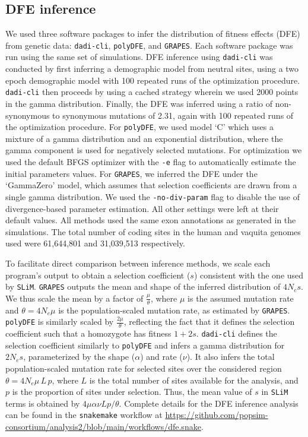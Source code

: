 \documentclass[hidelinks]{article}
\newcommand{\slim}{\texttt{SLiM}\xspace}
\newcommand{\snakemake}{\texttt{snakemake}\xspace}
\newcommand{\polydfe}{\texttt{polyDFE}\xspace}
\newcommand{\dadicli}{\texttt{dadi-cli}\xspace}
\newcommand{\grapes}{\texttt{GRAPES}\xspace}
\begin{document}
    \subsection*{DFE inference}
    We used three software packages to infer the distribution of fitness effects (DFE) from genetic data:
    \dadicli \citep{Huang2023,kim2017inference}, \polydfe \citep{tataru2020polydfe}, and \grapes \citep{galtier2016adaptive}.
    Each software package was run using the same set of simulations.
    DFE inference using \dadicli was conducted by first inferring a demographic model from neutral sites,
    using a two epoch demographic model with 100 repeated runs of the optimization procedure.
    \dadicli then proceeds by using a cached strategy wherein we used 2000 points in the gamma distribution.
    Finally, the DFE was inferred using a ratio of non-synonymous to synonymous mutations of 2.31, again with
    100 repeated runs of the optimization procedure.
    For \polydfe, we used model `C' which uses a mixture of a gamma distribution and an exponential distribution,
    where the gamma component is used for negatively selected mutations. For optimization we used
    the default BFGS optimizer with the \texttt{-e} flag to automatically estimate the initial parameters values.
    For \grapes, we inferred the DFE under the `GammaZero' model, which assumes that selection coefficients
    are drawn from a single gamma distribution. We used the \texttt{-no-div-param} flag to disable the use
    of divergence-based parameter estimation. All other settings were left at their default values.
    All methods used the same exon annotations as generated in the simulations. The total number of coding sites
    in the human and vaquita genomes used were 61,644,801 and 31,039,513 respectively.

    To facilitate direct comparison between inference methods,
    we scale each program's output to obtain a selection coefficient ($s$) consistent with the one used by \slim.
    \grapes outputs the mean and shape of the inferred distribution of $4N_es$.
    We thus scale the mean by a factor of  $\frac{\mu}{\theta}$,
    where $\mu$ is the assumed mutation rate and
    $\theta=4N_{e}\mu$ is the population-scaled mutation rate, as estimated by \grapes.
    \polydfe is similarly scaled by $\frac{2\mu}{\theta}$,
    reflecting the fact that it defines the selection coefficient such that a homozygote has fitness $1+ 2s$.
    \dadicli defines the selection coefficient similarly to \polydfe and infers a gamma distribution for $2 N_e s$, parameterized by the shape ($\alpha$) and rate ($\nu$).
    It also infers the total population-scaled mutation rate for selected sites over the considered region $\theta = 4 N_e \mu\, L\, p$,
    where $L$ is the total number of sites available for the analysis,
    and $p$ is the proportion of sites under selection.
    Thus, the mean value of $s$ in \slim terms is obtained by  $4\mu \alpha \nu L p / \theta$.
    Complete details for the DFE inference analysis can be found in the
    \snakemake workflow at \url{https://github.com/popsim-consortium/analysis2/blob/main/workflows/dfe.snake}.
\end{document}
